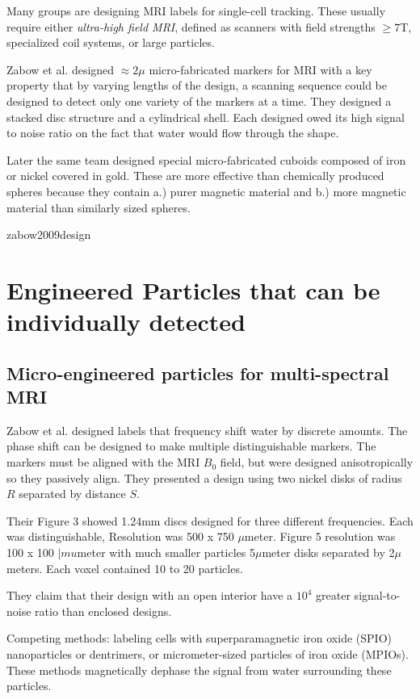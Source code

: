 \documentclass[letterpaper, 10 pt, conference]{ieeeconf}
\begin{document}
Many groups are designing MRI labels for single-cell tracking.  These usually require either \emph{ultra-high field MRI}, defined as scanners with field strengths $\ge7$T, specialized coil systems, or large particles.


Zabow et al. designed $\approx2\mu$ micro-fabricated markers for MRI with a key property that by varying lengths of the design, a scanning sequence could be designed to detect only one variety of the markers at a time.  They designed a stacked disc structure and a cylindrical shell\cite{zabow2008micro}.  Each designed owed its high signal to noise ratio on the fact that water would flow through the shape.

Later the same team designed special micro-fabricated cuboids composed of iron or nickel covered in gold.  These are more effective than chemically produced spheres because they contain a.) purer magnetic material and b.) more magnetic material than similarly sized spheres.


zabow2009design


\section{Engineered Particles that can be individually detected}

\subsection{Micro-engineered  particles for multi-spectral MRI}

Zabow et al. \cite{zabow2008micro} designed labels that frequency shift water by discrete amounts.  The phase shift can be designed  to make multiple distinguishable markers.  The markers must be aligned with the MRI $B_0$ field, but were designed anisotropically so they passively align. They presented a design using two nickel disks of radius $R$ separated by distance $S$. 

Their Figure 3 showed 1.24mm discs designed for three different frequencies.  Each was distinguishable, Resolution was 500 x 750 $
\mu$meter.  Figure 5 resolution was 100 x 100 $|mu$meter with much smaller particles 5$\mu$meter disks separated by 2$\mu$meters.  Each voxel contained 10 to 20 particles.

They claim that their design with an open interior have a $10^4$ greater signal-to-noise ratio than enclosed designs.

 
Competing methods:  labeling cells with superparamagnetic iron oxide (SPIO) nanoparticles or dentrimers\cite{bulte2001magnetodendrimers}, or micrometer-sized particles of iron oxide (MPIOs). These methods magnetically dephase the signal from water surrounding these particles.  
 
\end{document}
